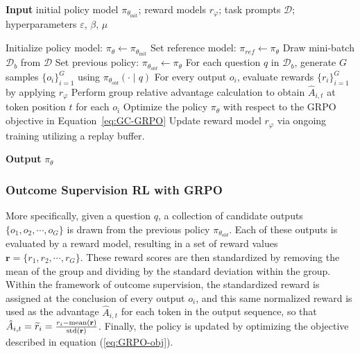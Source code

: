 \begin{itemize}[topsep=0pt]
\begin{algorithm}[t]
  \small
  \caption{Iterative Group Relative Policy Optimization}
  \textbf{Input} initial policy model $\pi_{\theta_{\text{init}}}$; reward models $r_\varphi$; task prompts $\mathcal{D}$;
  hyperparameters $\varepsilon$, $\beta$, $\mu$
  \begin{algorithmic}[1]
    \State Initialize policy model: $\pi_\theta \leftarrow \pi_{\theta_{\text{init}}}$
      \State Set reference model: $\pi_{ref} \leftarrow \pi_\theta$
      \State Draw mini-batch $\mathcal{D}_b$ from $\mathcal{D}$
      \State Set previous policy: $\pi_{\theta_{old}} \leftarrow \pi_\theta$
      \State For each question $q$ in $\mathcal{D}_b$, generate $G$ samples $\{o_i\}_{i=1}^G$ using $\pi_{\theta_{old}}(\cdot \mid q)$
      \State For every output $o_i$, evaluate rewards $\{r_i\}_{i=1}^{G}$ by applying $r_{\varphi}$
      \State Perform group relative advantage calculation to obtain $\hat{A}_{i,t}$ at token position $t$ for each $o_i$
        \State Optimize the policy $\pi_{\theta}$ with respect to the GRPO objective in Equation~\ref{eq:GC-GRPO}
      \EndFor
    \EndFor
    \State Update reward model $r_\varphi$ via ongoing training utilizing a replay buffer.
    \EndFor
  \end{algorithmic}
  \textbf{Output} $\pi_\theta$
  \label{alg:iter-grpo}
\end{algorithm}

\subsubsection{Outcome Supervision RL with GRPO} More specifically, given a question $q$, a collection of candidate outputs $\{o_1, o_2, \cdots, o_G\}$ is drawn from the previous policy $\pi_{\theta_{old}}$. Each of these outputs is evaluated by a reward model, resulting in a set of reward values $\mathbf{r}=\{r_1, r_2, \cdots, r_G\}$. These reward scores are then standardized by removing the mean of the group and dividing by the standard deviation within the group. Within the framework of outcome supervision, the standardized reward is assigned at the conclusion of every output $o_i$, and this same normalized reward is used as the advantage $\hat{A}_{i, t}$ for each token in the output sequence, so that $\hat{A}_{i, t} = \widetilde{r}_i = \frac{r_i- {\rm mean}(\mathbf{r})}{{\rm std}(\mathbf{r})}$. Finally, the policy is updated by optimizing the objective described in equation (\ref{eq:GRPO-obj}).


\end{itemize}
